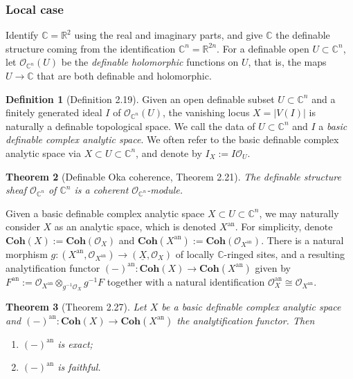 \documentclass{amsart}
\newtheorem{theorem}{Theorem}[subsection]
\theoremstyle{definition}
\newtheorem{definition}[theorem]{Definition}
\numberwithin{equation}{section}
\newcommand{\analytic}{\mathrm{an}}
\begin{document}
\subsubsection{Local case}
Identify $\mathbb{C} = \mathbb{R}^2$ using the real and imaginary parts,
and give $\mathbb{C}$ the definable structure coming from the identification $\mathbb{C}^n = \mathbb{R}^{2n}$.
For a definable open $U \subset \mathbb{C}^n$,
let $\mathcal{O}_{\mathbb{C}^n}(U)$ be the \emph{definable holomorphic} functions on $U$,
that is, the maps $U \to \mathbb{C}$ that are both definable and holomorphic.

\begin{definition}[Definition 2.19]
	Given an open definable subset $U \subset \mathbb{C}^n$ and
	a finitely generated ideal $I$ of $\mathcal{O}_{\mathbb{C}^n}(U)$,
	the vanishing locus $X = |V(I)|$ is naturally a definable topological space.
	We call the data of $U \subset \mathbb{C}^n$ and $I$ a \emph{basic definable complex analytic space}.
	We often refer to the basic definable complex analytic space via $X \subset U \subset \mathbb{C}^n$,
	and denote by $I_X := I\mathcal{O}_U$.
\end{definition}

\begin{theorem}[Definable Oka coherence, Theorem 2.21]
	The definable structure sheaf $\mathcal{O}_{\mathbb{C}^n}$ of $\mathbb{C}^n$ is a coherent $\mathcal{O}_{\mathbb{C}^n}$-module.
\end{theorem}

Given a basic definable complex analytic space $X \subset U \subset \mathbb{C}^n$,
we may naturally consider $X$ as an analytic space,
which is denoted $X^{\analytic}$.
For simplicity, denote $\mathbf{Coh}(X) := \mathbf{Coh}(\mathcal{O}_X)$ and
$\mathbf{Coh}(X^{\analytic}) := \mathbf{Coh}(\mathcal{O}_{X^{\analytic}})$.
There is a natural morphism $g: (X^{\analytic},\mathcal{O}_{X^{\analytic}}) \to (\underline{X},\mathcal{O}_X)$
of locally $\mathbb{C}$-ringed sites,
and a resulting analytification functor $(-)^{\analytic}: \mathbf{Coh}(X) \to \mathbf{Coh}(X^{\analytic})$
given by $F^{\analytic} := \mathcal{O}_{X^{\analytic}} \otimes_{g^{-1}\mathcal{O}_X} g^{-1}F$ together with
a natural identification $\mathcal{O}_X^{\analytic} \cong \mathcal{O}_{X^{\analytic}}$.

\begin{theorem}[Theorem 2.27]
	Let $X$ be a basic definable complex analytic space and
	$(-)^{\analytic} : \mathbf{Coh}(X) \to \mathbf{Coh}(X^{\analytic})$ the analytification functor.
	Then
	\begin{enumerate}[label = {(\arabic*)}]
		\item $(-)^{\analytic}$ is exact;
		\item $(-)^{\analytic}$ is faithful.
	\end{enumerate}
\end{theorem}
\end{document}
